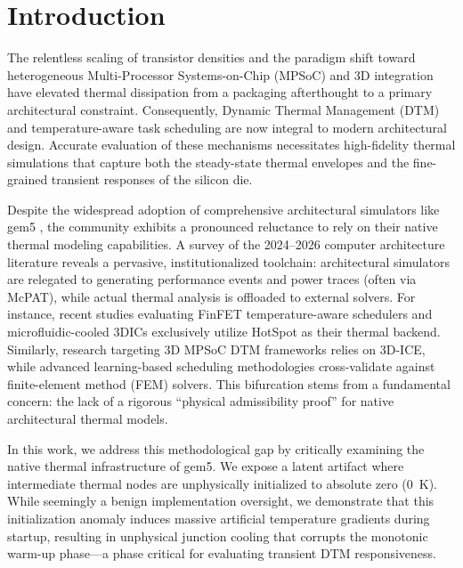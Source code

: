 \section{Introduction}
\label{sec:intro}

The relentless scaling of transistor densities and the paradigm shift toward heterogeneous Multi-Processor Systems-on-Chip (MPSoC) and 3D integration have elevated thermal dissipation from a packaging afterthought to a primary architectural constraint. Consequently, Dynamic Thermal Management (DTM) and temperature-aware task scheduling are now integral to modern architectural design. Accurate evaluation of these mechanisms necessitates high-fidelity thermal simulations that capture both the steady-state thermal envelopes and the fine-grained transient responses of the silicon die.

Despite the widespread adoption of comprehensive architectural simulators like gem5 \cite{gem5}, the community exhibits a pronounced reluctance to rely on their native thermal modeling capabilities. A survey of the 2024--2026 computer architecture literature reveals a pervasive, institutionalized toolchain: architectural simulators are relegated to generating performance events and power traces (often via McPAT), while actual thermal analysis is offloaded to external solvers. For instance, recent studies evaluating FinFET temperature-aware schedulers \cite{treafet2024} and microfluidic-cooled 3DICs \cite{cool3d2025} exclusively utilize HotSpot \cite{hotspot} as their thermal backend. Similarly, research targeting 3D MPSoC DTM frameworks \cite{mpsoc2024} relies on 3D-ICE, while advanced learning-based scheduling methodologies \cite{podtas2025, fasttherm2024} cross-validate against finite-element method (FEM) solvers. This bifurcation stems from a fundamental concern: the lack of a rigorous ``physical admissibility proof'' for native architectural thermal models.

In this work, we address this methodological gap by critically examining the native thermal infrastructure of gem5. We expose a latent artifact where intermediate thermal nodes are unphysically initialized to absolute zero (\SI{0}{\kelvin}). While seemingly a benign implementation oversight, we demonstrate that this initialization anomaly induces massive artificial temperature gradients during startup, resulting in unphysical junction cooling that corrupts the monotonic warm-up phase---a phase critical for evaluating transient DTM responsiveness.

